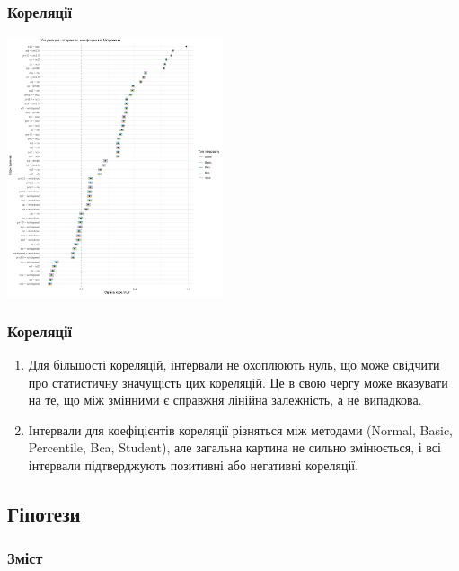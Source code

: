 \documentclass{beamer}
\begin{document}
\begin{frame}
  \frametitle{Кореляції}

  \begin{center}
    \includegraphics[height=3in]{plots/lab2/3-part/ci_intervals_v1.png}
  \end{center}
\end{frame}

\begin{frame}
  \frametitle{Кореляції}

  \begin{enumerate}
    \item Для більшості кореляцій, інтервали не охоплюють нуль, що може свідчити про
    статистичну значущість цих кореляцій. Це в свою чергу може вказувати на те,
    що між змінними є справжня лінійна залежність, а не випадкова.
    \item Інтервали для коефіцієнтів кореляції різняться між методами 
    (Normal, Basic, Percentile, Bca, Student), але загальна картина не сильно 
    змінюється, і всі інтервали підтверджують позитивні або негативні кореляції. 
    
  
  \end{enumerate}
\end{frame}


\begin{frame}
  \section{Гіпотези}

  \frametitle{Зміст}
  \tableofcontents[currentsection]
\end{frame}
\end{document}
